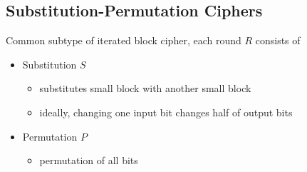 \documentclass[final]{article}
\begin{document}
\subsection{Substitution-Permutation Ciphers}
Common subtype of iterated block cipher, each round $R$ consists of
\begin{itemize}[nosep]
    \item Substitution $S$
          \begin{itemize}[nosep]
              \item substitutes small block with another small block
              \item ideally, changing one input bit changes half of output bits
          \end{itemize}
    \item Permutation $P$
          \begin{itemize}[nosep]
              \item permutation of all bits
          \end{itemize}
\end{itemize}
\end{document}
